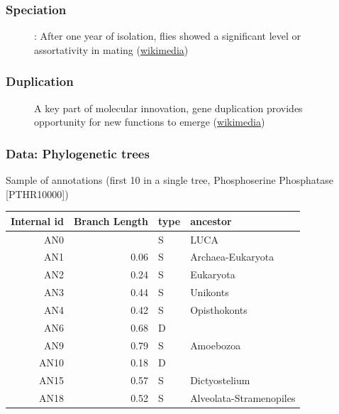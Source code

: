 \documentclass[aspectratio=169, 9pt]{beamer}
\begin{document}
\begin{frame}[label = duplicationvsspeciation]
\frametitle{Speciation}
\begin{figure}
\centering
\def\svgwidth{.8\linewidth}
\tiny

\caption{\cite{Dodd1989}: After one year of isolation, flies showed a significant level or assortativity in mating (\href{https://commons.wikimedia.org/wiki/File:Drosophila_speciation_experiment.svg}{wikimedia})}
\end{figure}

\vfill\hfill \hyperlink{aphylographicalview}{}

\end{frame}

\begin{frame}
\frametitle{Duplication}
\begin{figure}
\centering
\def\svgwidth{.6\linewidth}
\tiny

\caption{A key part of molecular innovation, gene duplication provides opportunity for new functions to emerge (\href{https://en.wikipedia.org/wiki/File:Evolution_fate_duplicate_genes_-_vector.svg}{wikimedia})}
\end{figure}

\vfill\hfill \hyperlink{aphylographicalview}{}

\end{frame}

\begin{frame}[label=phylo-data]
	\frametitle{Data: Phylogenetic trees}
	
	Sample of annotations (first 10 in a single tree, Phosphoserine Phosphatase [PTHR10000])
	
	\small
	
	\begin{table}[ht]
		\centering
		\begin{tabular}{rrll}
			\toprule
			Internal id & Branch Length & type & ancestor \\ 
			\midrule
			AN0 &  & S & LUCA \\ 
			AN1 & 0.06 & S & Archaea-Eukaryota \\ 
			AN2 & 0.24 & S & Eukaryota \\ 
			AN3 & 0.44 & S & Unikonts \\ 
			AN4 & 0.42 & S & Opisthokonts \\ 
			AN6 & 0.68 & D &  \\ 
			AN9 & 0.79 & S & Amoebozoa \\ 
			AN10 & 0.18 & D &  \\ 
			AN15 & 0.57 & S & Dictyostelium \\ 
			AN18 & 0.52 & S & Alveolata-Stramenopiles \\ 
			\bottomrule
		\end{tabular}
	\end{table}
	
\end{frame}
\end{document}
